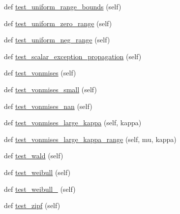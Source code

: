 \begin{DoxyCompactItemize}
\item 
def \hyperlink{classnumpy_1_1random_1_1tests_1_1test__generator__mt19937_1_1TestRandomDist_a54abf0c2467e8e2714a02299ad0aa7d8}{test\+\_\+uniform\+\_\+range\+\_\+bounds} (self)
\item 
def \hyperlink{classnumpy_1_1random_1_1tests_1_1test__generator__mt19937_1_1TestRandomDist_ae60053aa5e4d64f133af9397762325c2}{test\+\_\+uniform\+\_\+zero\+\_\+range} (self)
\item 
def \hyperlink{classnumpy_1_1random_1_1tests_1_1test__generator__mt19937_1_1TestRandomDist_a57bf5d021ca6dc3e1327c47142c383cc}{test\+\_\+uniform\+\_\+neg\+\_\+range} (self)
\item 
def \hyperlink{classnumpy_1_1random_1_1tests_1_1test__generator__mt19937_1_1TestRandomDist_a38e14569ed203b83bda8150e56c9a5e0}{test\+\_\+scalar\+\_\+exception\+\_\+propagation} (self)
\item 
def \hyperlink{classnumpy_1_1random_1_1tests_1_1test__generator__mt19937_1_1TestRandomDist_ac9e7cbe0cccebed75fc0c6f20d098ddd}{test\+\_\+vonmises} (self)
\item 
def \hyperlink{classnumpy_1_1random_1_1tests_1_1test__generator__mt19937_1_1TestRandomDist_a80bb7060105de87fdc3d724b3af31f64}{test\+\_\+vonmises\+\_\+small} (self)
\item 
def \hyperlink{classnumpy_1_1random_1_1tests_1_1test__generator__mt19937_1_1TestRandomDist_ad7b7f6c3b1124477d4c8198a7eab2864}{test\+\_\+vonmises\+\_\+nan} (self)
\item 
def \hyperlink{classnumpy_1_1random_1_1tests_1_1test__generator__mt19937_1_1TestRandomDist_acf9a6d3a630164027e1db38f0ad024ae}{test\+\_\+vonmises\+\_\+large\+\_\+kappa} (self, kappa)
\item 
def \hyperlink{classnumpy_1_1random_1_1tests_1_1test__generator__mt19937_1_1TestRandomDist_a98b92b30901e4cf2c0ba2e4e6b506245}{test\+\_\+vonmises\+\_\+large\+\_\+kappa\+\_\+range} (self, mu, kappa)
\item 
def \hyperlink{classnumpy_1_1random_1_1tests_1_1test__generator__mt19937_1_1TestRandomDist_af9aeeedb9283b2d6b64076a6d51c7632}{test\+\_\+wald} (self)
\item 
def \hyperlink{classnumpy_1_1random_1_1tests_1_1test__generator__mt19937_1_1TestRandomDist_a11a9b895aa4694b6719e0e350910670b}{test\+\_\+weibull} (self)
\item 
def \hyperlink{classnumpy_1_1random_1_1tests_1_1test__generator__mt19937_1_1TestRandomDist_a609634a689be7a4e074748727a1955a8}{test\+\_\+weibull\+\_} (self)
\item 
def \hyperlink{classnumpy_1_1random_1_1tests_1_1test__generator__mt19937_1_1TestRandomDist_ad4c9df750c6f9a0a34b51c35ee344e68}{test\+\_\+zipf} (self)
\end{DoxyCompactItemize}
